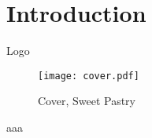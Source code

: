 \documentclass[
    ref = refDemo,
]{spBeamer}
\begin{document}
    \section{Introduction}
        \begin{frame}{Logo}
            \begin{figure}
                \texttt{[image: cover.pdf]}
                \caption{Cover, Sweet Pastry}
            \end{figure}
            aaa
        \end{frame}
    
\end{document}
